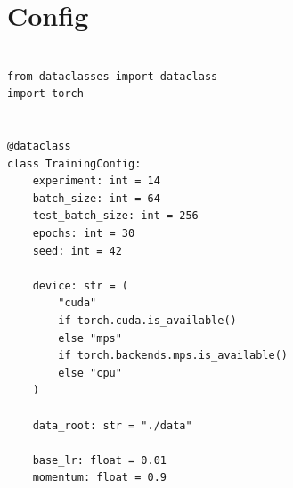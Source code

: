 \chapter{Config}
\label{appendix:config}

\begin{verbatim}

from dataclasses import dataclass
import torch


@dataclass
class TrainingConfig:
    experiment: int = 14
    batch_size: int = 64
    test_batch_size: int = 256
    epochs: int = 30
    seed: int = 42

    device: str = (
        "cuda"
        if torch.cuda.is_available()
        else "mps"
        if torch.backends.mps.is_available()
        else "cpu"
    )

    data_root: str = "./data"

    base_lr: float = 0.01
    momentum: float = 0.9

\end{verbatim}
